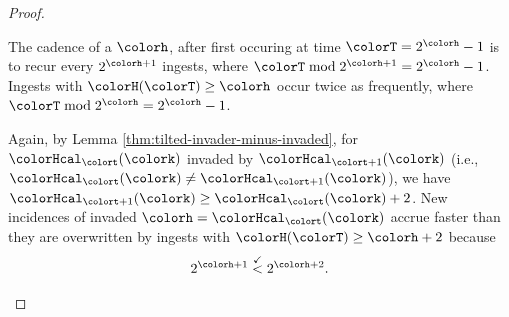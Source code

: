 \begin{proof}
\begin{proofpart}
The cadence of a \hv{} $\colorh$, after first occuring at time $\colorT=2^{\colorh} - 1$ is to recur every $2^{\colorh + 1}$ ingests, where $\colorT \bmod 2^{\colorh + 1} = 2^{\colorh} - 1$.
Ingests with \hv{} $\colorH(\colorT) \geq \colorh$ occur twice as frequently, where $\colorT \bmod 2^{\colorh} = 2^{\colorh} - 1$.

Again, by Lemma \ref{thm:tilted-invader-minus-invaded}, for \hv{} $\colorHcal_{\colort}(\colork)$ invaded by \hv{} $\colorHcal_{\colort + 1}(\colork)$ (i.e., $\colorHcal_{\colort}(\colork) \neq \colorHcal_{\colort + 1}(\colork)$), we have $\colorHcal_{\colort + 1}(\colork) \geq \colorHcal_{\colort}(\colork) + 2$.
New incidences of invaded \hv{} $\colorh = \colorHcal_{\colort}(\colork)$ accrue faster than they are overwritten by ingests with $\colorH(\colorT) \geq \colorh + 2$ because
\begin{align*}
2^{\colorh + 1} \stackrel{\checkmark}{<} 2^{\colorh + 2}.
\end{align*}
\end{proofpart}

\end{proof}
